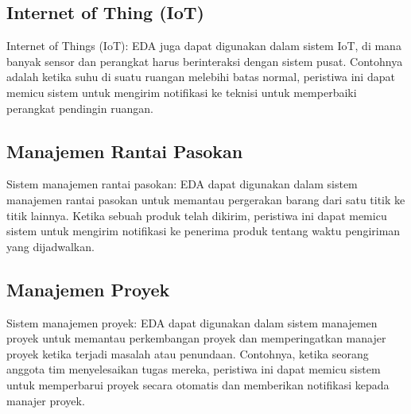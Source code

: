 \subsection{Internet of Thing (IoT)}
 Internet of Things (IoT): EDA juga dapat digunakan dalam sistem IoT, di mana banyak sensor dan perangkat harus berinteraksi dengan sistem pusat. Contohnya adalah ketika suhu di suatu ruangan melebihi batas normal, peristiwa ini dapat memicu sistem untuk mengirim notifikasi ke teknisi untuk memperbaiki perangkat pendingin ruangan.
\subsection{Manajemen Rantai Pasokan}
 Sistem manajemen rantai pasokan: EDA dapat digunakan dalam sistem manajemen rantai pasokan untuk memantau pergerakan barang dari satu titik ke titik lainnya. Ketika sebuah produk telah dikirim, peristiwa ini dapat memicu sistem untuk mengirim notifikasi ke penerima produk tentang waktu pengiriman yang dijadwalkan.
 \subsection{Manajemen Proyek}
 Sistem manajemen proyek: EDA dapat digunakan dalam sistem manajemen proyek untuk memantau perkembangan proyek dan memperingatkan manajer proyek ketika terjadi masalah atau penundaan. Contohnya, ketika seorang anggota tim menyelesaikan tugas mereka, peristiwa ini dapat memicu sistem untuk memperbarui proyek secara otomatis dan memberikan notifikasi kepada manajer proyek.




